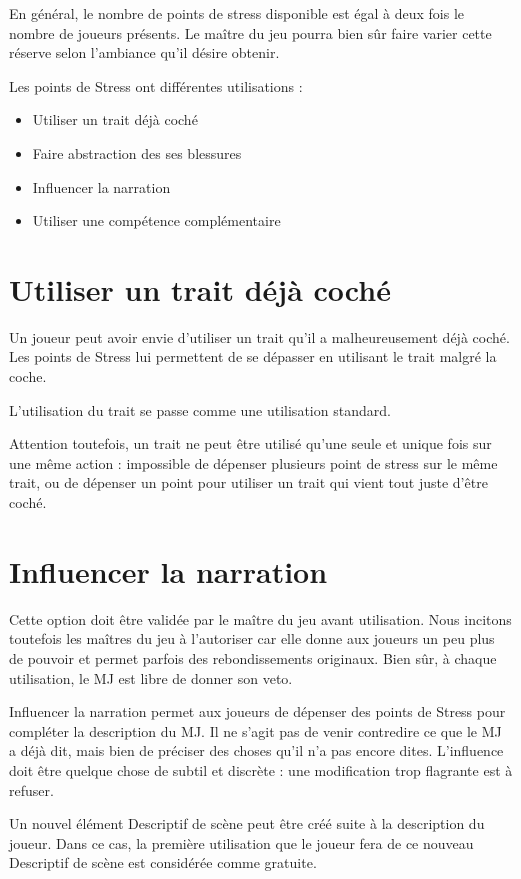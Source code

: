 \documentclass{conf/FusinaClass}
\begin{document}
En général, le nombre de points de stress disponible est égal à deux fois le nombre de joueurs présents. Le maître du jeu pourra bien sûr faire varier cette réserve selon l'ambiance qu'il désire obtenir.

Les points de Stress ont différentes utilisations :

\begin{itemize}
\item Utiliser un trait déjà coché
\item Faire abstraction des ses blessures
\item Influencer la narration
\item Utiliser une compétence complémentaire
\end{itemize}

\section{Utiliser un trait déjà coché}
Un joueur peut avoir envie d'utiliser un trait qu'il a malheureusement déjà coché. Les points de Stress lui permettent de se dépasser en utilisant le trait malgré la coche.

L'utilisation du trait se passe comme une utilisation standard.

Attention toutefois, un trait ne peut être utilisé qu'une seule et unique fois sur une même action : impossible de dépenser plusieurs point de stress sur le même trait, ou de dépenser un point pour utiliser un trait qui vient tout juste d'être coché.

\section{Influencer la narration}
Cette option doit être validée par le maître du jeu avant utilisation. Nous incitons toutefois les maîtres du jeu à l'autoriser car elle donne aux joueurs un peu plus de pouvoir et permet parfois des rebondissements originaux. Bien sûr, à chaque utilisation, le MJ est libre de donner son veto.

Influencer la narration permet aux joueurs de dépenser des points de Stress pour compléter la description du MJ. Il ne s'agit pas de venir contredire ce que le MJ a déjà dit, mais bien de préciser des choses qu'il n'a pas encore dites. L'influence doit être quelque chose de subtil et discrète : une modification trop flagrante est à refuser.

Un nouvel élément Descriptif de scène peut être créé suite à la description du joueur. Dans ce cas, la première utilisation que le joueur fera de ce nouveau Descriptif de scène est considérée comme gratuite.
\end{document}
